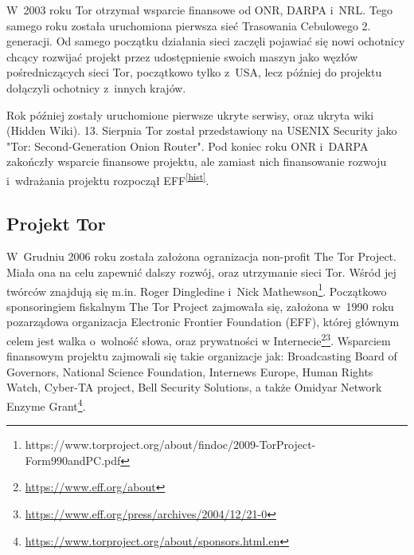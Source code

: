 W~2003 roku Tor otrzymał wsparcie finansowe od ONR, DARPA i~NRL. Tego samego roku została uruchomiona pierwsza sieć Trasowania Cebulowego 2. generacji. Od samego początku działania sieci zaczęli pojawiać się nowi ochotnicy chcący rozwijać projekt przez udostępnienie swoich maszyn jako węzłów pośredniczących sieci Tor, początkowo tylko z~USA, lecz później do projektu dołączyli ochotnicy z~innych krajów. 

Rok później zostały uruchomione pierwsze ukryte serwisy, oraz ukryta wiki (Hidden Wiki). 13. Sierpnia Tor został przedstawiony na USENIX Security jako "Tor: Second-Generation Onion Router". Pod koniec roku ONR i~DARPA zakończły wsparcie finansowe projektu, ale zamiast nich finansowanie rozwoju i~wdrażania projektu rozpoczął EFF\textsuperscript{\ref{hist}}.

\subsection{Projekt Tor}
W~Grudniu 2006 roku została założona ogranizacja non-profit The Tor Project. Miała ona na celu zapewnić dalszy rozwój, oraz utrzymanie sieci Tor. Wśród jej twórców znajdują się m.in. Roger Dingledine i~Nick Mathewson\footnote{https://www.torproject.org/about/findoc/2009-TorProject-Form990andPC.pdf}. Początkowo sponsoringiem fiskalnym The Tor Project zajmowała się, założona w~1990 roku pozarządowa organizacja Electronic Frontier Foundation (EFF), której głównym celem jest walka o~wolność słowa, oraz prywatności w Internecie\footnote{\url{https://www.eff.org/about}}\footnote{\url{https://www.eff.org/press/archives/2004/12/21-0}}. Wsparciem finansowym projektu zajmowali się takie organizacje jak: Broadcasting Board of Governors, National Science Foundation, Internews Europe, Human Rights Watch, Cyber-TA project, Bell Security Solutions, a także Omidyar Network Enzyme Grant\footnote{\url{https://www.torproject.org/about/sponsors.html.en}}.

